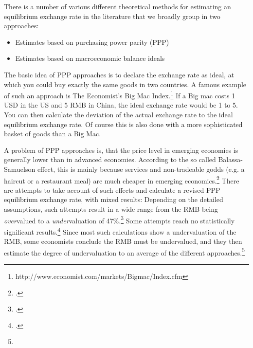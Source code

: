 

There is a number of various different theoretical methods for estimating an 
equilibrium exchange rate in the literature that we broadly group in two approaches:

\begin{itemize}
\item{Estimates based on purchasing power parity (PPP)}
\item{Estimates based on macroeconomic balance ideals}
\end{itemize}


The basic idea of PPP approaches is to declare the exchange rate as ideal, at which you could buy exactly the same goods in two countries. A famous example of such an approach is The Economist's Big Mac Index.\footnote{http://www.economist.com/markets/Bigmac/Index.cfm} If a Big mac costs 1 USD in the US and 5 RMB in China, the ideal exchange rate would be 1 to 5. You can then calculate the deviation of the actual exchange rate to the ideal equilibrium exchange rate. Of course this is also done with a more sophisticated basket of goods than a Big Mac. 

A problem of PPP approaches is, that the price level in emerging economies is generally lower than in advanced economies. According to the so called Balassa-Samuelson effect, this is mainly because services and non-tradeable godds (e.g. a haircut or a restaurant meal) are much cheaper in emerging economics.\footnote{\cite[pp. 82]{CheungChinn2010}.} There are attempts to take account of such effects and calculate a revised PPP equilibrium exchange rate, with mixed results: Depending on the detailed assumptions, such attempts result in a wide range from the RMB being \emph{over}valued to a \emph{under}valuation of 47\%.\footnote{\cite[pp. 72]{Subramanian}.} Some attempts reach no statistically significant results.\footnote{\cite[p. 83]{CheungChinn2010}.} Since most such calculations show a undervaluation of the RMB, some economists conclude the RMB must be undervalued, and they then estimate the degree of undervaluation to an average of the different approaches.\footnote{}%

